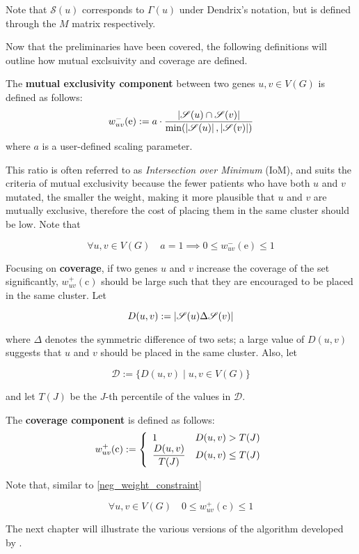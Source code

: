 Note that $\mathscr{S}(u)$ corresponds to $\Gamma(u)$ under Dendrix's notation, but is defined through the $M$ matrix respectively.

Now that the preliminaries have been covered, the following definitions will outline how mutual exclsuivity and coverage are defined.

\begin{definition} \label{me_comp}
    The \textbf{mutual exclusivity component} between two genes $u, v \in V(G)$ is defined as follows: $$w_{uv}^-(\mathrm e) := a \cdot \dfrac{\abs{\mathscr{S}(u) \cap \mathscr{S}(v)}}{\min(\abs{\mathscr{S}(u)}, \abs{\mathscr{S}(v)})}$$ where $a$ is a user-defined scaling parameter.
\end{definition}

This ratio is often referred to as \textit{Intersection over Minimum} (IoM), and suits the criteria of mutual exclusivity because the fewer patients who have both $u$ and $v$ mutated, the smaller the weight, making it more plausible that $u$ and $v$ are mutually exclusive, therefore the cost of placing them in the same cluster should be low. Note that

\begin{equation}\label{neg_weight_constraint}
    \forall u, v \in V(G) \quad a = 1 \implies 0 \le w_{uv}^-(\mathrm e) \le 1
\end{equation}

Focusing on \textbf{coverage}, if two genes $u$ and $v$ increase the coverage of the set significantly, $w_{uv}^+(\mathrm c)$ should be large such that they are encouraged to be placed in the same cluster. Let

\begin{equation}
    D(u, v) := \abs{\mathscr{S}(u) \Delta \mathscr{S}(v)}
\end{equation}

where $\Delta$ denotes the symmetric difference of two sets; a large value of $D(u, v)$ suggests that $u$ and $v$ should be placed in the same cluster. Also, let

\begin{equation}
    \mathscr{D} := \{D(u, v) \mid u, v \in V(G)\}
\end{equation}

and let $T(J)$ be the $J$-th percentile of the values in $\mathscr{D}$.

\begin{definition} \label{co_comp}
    The \textbf{coverage component} is defined as follows: $$w_{uv}^+(\mathrm c) := \soe{ll}{1 & D(u, v) > T(J) \\ \dfrac{D(u, v)}{T(J)} & D(u, v) \le T(J)}$$
\end{definition}

Note that, similar to \cref{neg_weight_constraint}

\begin{equation}
    \forall u, v \in V(G) \quad 0 \le w_{uv}^+(\mathrm c) \le 1
\end{equation}

The next chapter will illustrate the various versions of the algorithm developed by \textcite{c3}.

\cleardoublepage
